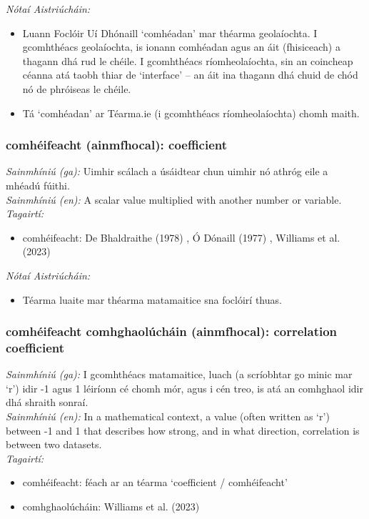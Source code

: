  \noindent \textit{Nótaí Aistriúcháin:}
\begin{itemize}
	\item Luann Foclóir Uí Dhónaill `comhéadan' mar théarma geolaíochta. I gcomhthéacs geolaíochta, is ionann comhéadan agus an áit (fhisiceach) a thagann dhá rud le chéile. I gcomhthéacs ríomheolaíochta, sin an coincheap céanna atá taobh thiar de `interface' -- an áit ina thagann dhá chuid de chód nó de phróiseas le chéile.
	\item Tá `comhéadan' ar Téarma.ie (i gcomhthéacs ríomheolaíochta) chomh maith.
\end{itemize}


\subsubsection*{comhéifeacht (ainmfhocal): coefficient}
 \noindent \textit{Sainmhíniú (ga):} Uimhir scálach a úsáidtear chun uimhir nó athróg eile a mhéadú fúithi.
\\
 \noindent \textit{Sainmhíniú (en):} A scalar value multiplied with another number or variable.
\\
 \noindent \textit{Tagairtí:}
\begin{itemize}
	\item comhéifeacht: De Bhaldraithe (1978) \cite{de-bhaldraithe}, Ó Dónaill (1977) \cite{odonaill}, Williams et al. (2023) \cite{storchiste}
\end{itemize}

 \noindent \textit{Nótaí Aistriúcháin:}
\begin{itemize}
	\item Téarma luaite mar théarma matamaitice sna foclóirí thuas.
\end{itemize}


\subsubsection*{comhéifeacht comhghaolúcháin (ainmfhocal): correlation coefficient}
 \noindent \textit{Sainmhíniú (ga):} I gcomhthéacs matamaitice, luach (a scríobhtar go minic mar `r') idir -1 agus 1 léiríonn cé chomh mór, agus i cén treo, is atá an comhghaol idir dhá shraith sonraí.
\\
 \noindent \textit{Sainmhíniú (en):} In a mathematical context, a value (often written as `r') between -1 and 1 that describes how strong, and in what direction, correlation is between two datasets.
\\
 \noindent \textit{Tagairtí:}
\begin{itemize}
	\item comhéifeacht: féach ar an téarma `coefficient / comhéifeacht'
	\item comhghaolúcháin: Williams et al. (2023) \cite{storchiste}
\end{itemize}


